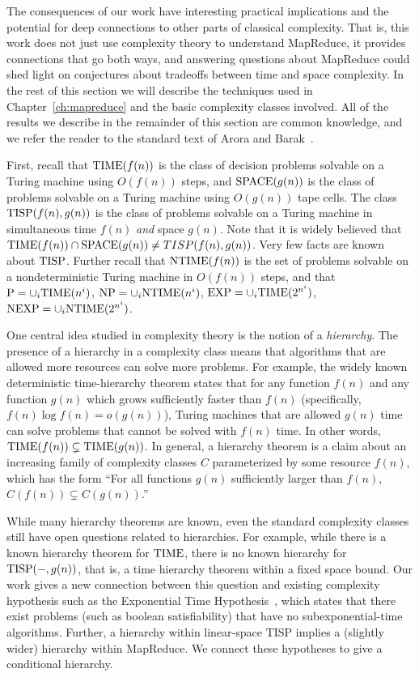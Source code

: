 The consequences of our work have interesting practical implications and the
potential for deep connections to other parts of classical complexity. That is,
this work does not just use complexity theory to understand MapReduce, it
provides connections that go both ways, and answering questions about MapReduce
could shed light on conjectures about tradeoffs between time and space
complexity. In the rest of this section we will describe the techniques used in
Chapter~\ref{ch:mapreduce} and the basic complexity classes involved. All of
the results we describe in the remainder of this section are common knowledge,
and we refer the reader to the standard text of Arora and Barak~\cite{AroraB09}.

First, recall that $\textup{TIME}(f(n))$ is the class of decision problems solvable on
a Turing machine using $O(f(n))$ steps, and $\textup{SPACE}(g(n))$ is the class of
problems solvable on a Turing machine using $O(g(n))$ tape cells. The class
$\textup{TISP}(f(n), g(n))$ is the class of problems solvable on a Turing machine in
simultaneous time $f(n)$ \emph{and} space $g(n)$. Note that it is widely
believed that $\textup{TIME}(f(n)) \cap \textup{SPACE}(g(n)) \neq TISP(f(n), g(n))$. Very few
facts are known about $\textup{TISP}$. Further recall that $\textup{NTIME}(f(n))$ is the set of
problems solvable on a nondeterministic Turing machine in $O(f(n))$ steps, and
that $\textup{P} = \cup_i \textup{TIME}(n^i)$, $\textup{NP} = \cup_i \textup{NTIME}(n^i)$, $\textup{EXP} = \cup_i
\textup{TIME}(2^{n^i})$, $\textup{NEXP} = \cup_i \textup{NTIME}(2^{n^i})$. 

One central idea studied in complexity theory is the notion of a
\emph{hierarchy}. The presence of a hierarchy in a complexity class means that
algorithms that are allowed more resources can solve more problems. For
example, the widely known deterministic time-hierarchy theorem states that for
any function $f(n)$ and any function $g(n)$ which grows sufficiently faster
than $f(n)$ (specifically, $f(n) \log f(n) = o(g(n))$), Turing machines that
are allowed $g(n)$ time can solve problems that cannot be solved with $f(n)$
time. In other words, $\textup{TIME}(f(n)) \subsetneq \textup{TIME}(g(n))$. In general, a
hierarchy theorem is a claim about an increasing family of complexity classes
$C$ parameterized by some resource $f(n)$, which has the form ``For all
functions $g(n)$ sufficiently larger than $f(n)$, $C(f(n)) \subsetneq
C(g(n))$.'' 

While many hierarchy theorems are known, even the standard complexity classes
still have open questions related to hierarchies. For example, while there is a
known hierarchy theorem for $\textup{TIME}$, there is no known hierarchy for $\textup{TISP}(-,
g(n))$, that is, a time hierarchy theorem within a fixed space bound. Our work
gives a new connection between this question and existing complexity hypothesis
such as the Exponential Time Hypothesis~\cite{ImpagliazzoPZ01}, which states
that there exist problems (such as boolean satisfiability) that have no
subexponential-time algorithms.  Further, a hierarchy within linear-space TISP
implies a (slightly wider) hierarchy within MapReduce. We connect these
hypotheses to give a conditional hierarchy. 

